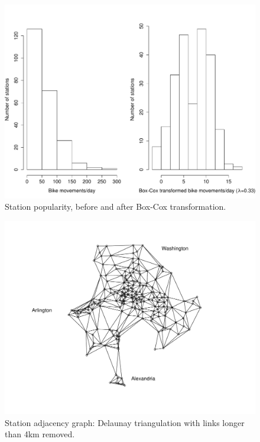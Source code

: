 \documentclass[letterpaper,11pt]{article}
\begin{document}
\begin{figure}[t]
  \includegraphics[width=\textwidth]{boxcox.pdf}
  \caption{\label{fig:boxcox}Station popularity, before and after Box-Cox transformation.}
\end{figure}

\begin{figure}[t]
  \includegraphics[width=\textwidth]{connectivity_labels.pdf}
  \caption{\label{fig:nbmat} Station adjacency graph: Delaunay triangulation with links
    longer than 4km removed.}
\end{figure}
\end{document}
